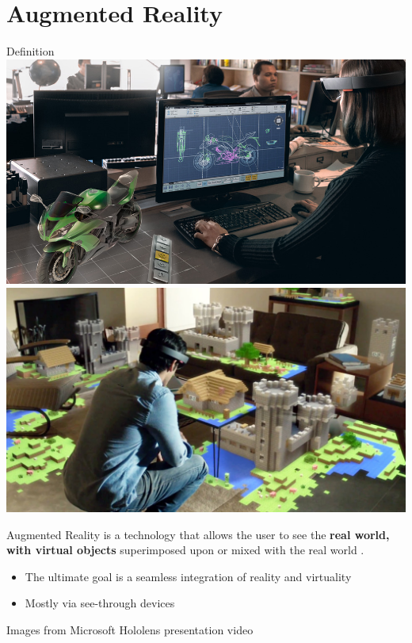 \documentclass[presentation]{beamer} %
\begin{document}
\section{Augmented Reality}
\begin{frame}{Definition}
  \includegraphics[width=.49\textwidth]{images/holobike}
  \includegraphics[width=.49\textwidth]{images/holominecraft}
  \begin{block}{Augmented Reality}
    is a technology that allows the user to see the \textbf{real world, with virtual objects} superimposed upon or mixed with the real world \cite{Azuma97}.
  \begin{itemize}
   \item The ultimate goal is a seamless integration of reality and virtuality
   \item Mostly via see-through devices
  \end{itemize}
  \end{block}
  \begin{center}
    \tiny{Images from Microsoft Hololens presentation video}
  \end{center}
\end{frame}
\end{document}

